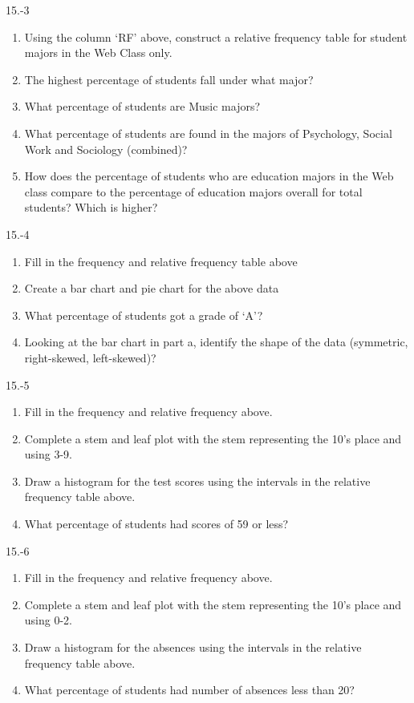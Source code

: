 \begin{exsol@solution}{15.-3}
  \begin{enumerate}
  \item	Using the column `RF' above, construct a relative frequency table for student majors in the Web Class only.
  \item	The highest percentage of students fall under what major?
  \item	What percentage of students are Music majors?
  \item	What percentage of students are found in the majors of Psychology, Social Work and Sociology (combined)?
  \item	How does the percentage of students who are education majors in the Web class compare to the percentage of education majors overall for total students?  Which is higher?
\end{enumerate}
\end{exsol@solution}
\begin{exsol@solution}{15.-4}
  \begin{enumerate}
  \item Fill in the frequency and relative frequency table above
  \item  Create a bar chart and pie chart for the above data
  \item  What percentage of students got a grade of `A'?
  \item  Looking at the bar chart in part a, identify the shape of the data (symmetric, right-skewed, left-skewed)?
\end{enumerate}
\end{exsol@solution}
\begin{exsol@solution}{15.-5}
  \begin{enumerate}
  \item Fill in the frequency and relative frequency above.
  \item	Complete a stem and leaf plot with the stem representing the 10’s place and using 3-9.
  \item Draw a histogram for the test scores using the intervals in the relative frequency table above.
  \item	What percentage of students had scores of 59 or less?
\end{enumerate}

\end{exsol@solution}
\begin{exsol@solution}{15.-6}
\begin{enumerate}
  \item	Fill in the frequency and relative frequency above.
  \item	Complete a stem and leaf plot with the stem representing the 10's place and using 0-2.
  \item	Draw a histogram for the absences using the intervals in the relative frequency table above.
  \item	What percentage of students had number of absences less than 20?
\end{enumerate}

\end{exsol@solution}
